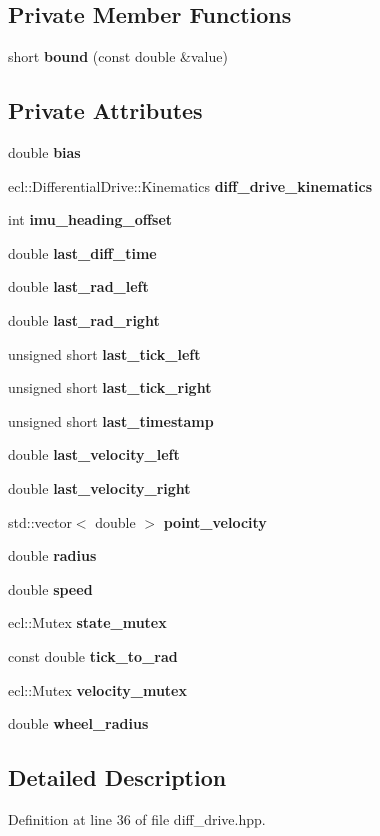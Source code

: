 \subsection*{\-Private \-Member \-Functions}
\begin{DoxyCompactItemize}
\item 
short {\bf bound} (const double \&value)
\end{DoxyCompactItemize}
\subsection*{\-Private \-Attributes}
\begin{DoxyCompactItemize}
\item 
double {\bf bias}
\item 
ecl\-::\-Differential\-Drive\-::\-Kinematics {\bf diff\-\_\-drive\-\_\-kinematics}
\item 
int {\bf imu\-\_\-heading\-\_\-offset}
\item 
double {\bf last\-\_\-diff\-\_\-time}
\item 
double {\bf last\-\_\-rad\-\_\-left}
\item 
double {\bf last\-\_\-rad\-\_\-right}
\item 
unsigned short {\bf last\-\_\-tick\-\_\-left}
\item 
unsigned short {\bf last\-\_\-tick\-\_\-right}
\item 
unsigned short {\bf last\-\_\-timestamp}
\item 
double {\bf last\-\_\-velocity\-\_\-left}
\item 
double {\bf last\-\_\-velocity\-\_\-right}
\item 
std\-::vector$<$ double $>$ {\bf point\-\_\-velocity}
\item 
double {\bf radius}
\item 
double {\bf speed}
\item 
ecl\-::\-Mutex {\bf state\-\_\-mutex}
\item 
const double {\bf tick\-\_\-to\-\_\-rad}
\item 
ecl\-::\-Mutex {\bf velocity\-\_\-mutex}
\item 
double {\bf wheel\-\_\-radius}
\end{DoxyCompactItemize}


\subsection{\-Detailed \-Description}


\-Definition at line 36 of file diff\-\_\-drive.\-hpp.




